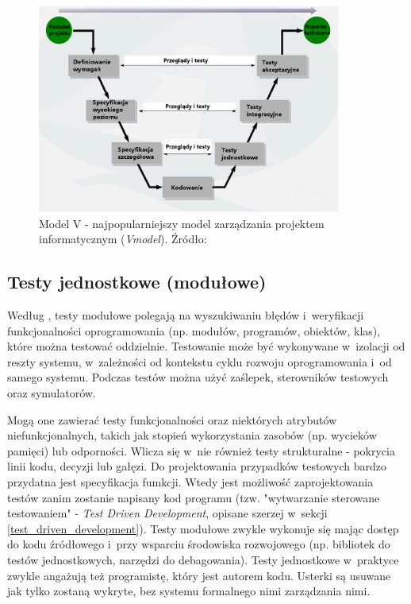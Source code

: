 \begin{figure}[!htb]
    \centering
    \includegraphics[width=10cm]{imgs/ch2_model_v.jpg}
    \caption{Model V - najpopularniejszy model zarządzania projektem informatycznym (\textit{V\-model}). Źródło: \cite{website:android:modelv}}
    \label{fig:model_v}
\end{figure} 

\subsection{Testy jednostkowe (modułowe)}

Według \cite{bib:sylabus:foundation}, testy modułowe polegają na wyszukiwaniu błędów i~weryfikacji funkcjonalności oprogramowania (np. modułów, programów, obiektów, klas), które można testować oddzielnie. Testowanie może być wykonywane w~izolacji od reszty systemu, w~zależności od kontekstu cyklu rozwoju oprogramowania i~od samego systemu. Podczas testów można użyć zaślepek, sterowników testowych oraz symulatorów. 

Mogą one zawierać testy funkcjonalności oraz niektórych atrybutów niefunkcjonalnych, takich jak stopień wykorzystania zasobów (np. wycieków pamięci) lub odporności. Wlicza się w~nie również testy strukturalne - pokrycia linii kodu, decyzji lub gałęzi. Do projektowania przypadków testowych bardzo przydatna jest specyfikacja fumkcji. Wtedy jest możliwość zaprojektowania testów zanim zostanie napisany kod programu (tzw. "wytwarzanie sterowane testowaniem" - \textit{Test Driven Development}, opisane szerzej w~sekcji \ref{test_driven_development}). Testy modułowe zwykle wykonuje się mając dostęp do kodu źródłowego i~przy wsparciu środowiska rozwojowego (np. bibliotek do testów jednostkowych, narzędzi do debagowania). Testy jednostkowe w~praktyce zwykle angażują też programistę, który jest autorem kodu. Usterki są usuwane jak tylko zostaną wykryte, bez systemu formalnego nimi zarządzania nimi.

